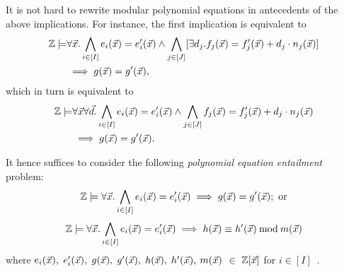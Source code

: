 It is not hard to rewrite modular polynomial equations in antecedents
of the above implications. For instance, the first implication is
equivalent to
\begin{equation*}
\begin{aligned}
\bbfZ \models & \forall \vx. %
\bigwedge\limits_{i \in [I]} e_i (\vx) = e'_i (\vx) \wedge
\bigwedge\limits_{j \in [J]} [\exists d_j. f_j (\vx) = f'_j (\vx) + d_j \cdot n_j (\vx)] \\
& \implies
g (\vx) = g' (\vx),
\end{aligned}
\end{equation*}
which in turn is equivalent to
\begin{equation*}
\begin{aligned}
\bbfZ \models & \forall \vx \forall \vd. %
\bigwedge\limits_{i \in [I]} e_i (\vx) = e'_i (\vx) \wedge
\bigwedge\limits_{j \in [J]} f_j (\vx) = f'_j (\vx) + d_j \cdot n_j (\vx) \\
& \implies
g (\vx) = g' (\vx).
\end{aligned}
\end{equation*}

It hence suffices to consider the following
\emph{polynomial equation entailment} problem:
\vspace{-.5em}
\begin{equation}
  \label{eq:reduced-polynomial-equation-implicant}
  \bbfZ \models \forall \vx. %
  \bigwedge\limits_{i \in [I]} e_i (\vx) = e'_i (\vx)
  \implies
  g (\vx) = g' (\vx); \textmd{ or}
\end{equation}
\vspace{-.5em}
 \begin{equation}
   \label{eq:reduced-modular-polynomial-equation-implicant}
   \bbfZ \models \forall \vx. %
   \bigwedge\limits_{i \in [I]} e_i (\vx) = e'_i (\vx)
   \implies
   h (\vx) \equiv h' (\vx) \mod m (\vx)
\vspace{-.5em}
 \end{equation}
 where $e_i (\vec{x}),$ $e'_i (\vec{x}),$ $g (\vec{x}),$ $g' (\vec{x}),$ $h (\vec{x}),$ $h' (\vec{x}),$ $m (\vec{x})$
 $\in$ $\mathbb{Z}[\vec{x}]$ for $i \in [I]$~\cite{H:07:AENTP}.


